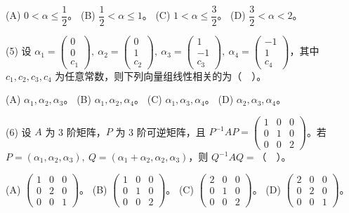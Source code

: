 \documentclass[UTF8,12pt]{ctexart}
\begin{document}
(A) \(\displaystyle 0<\alpha\leq\dfrac{\displaystyle 1}{\displaystyle 2}\)。 (B) \(\displaystyle \dfrac{\displaystyle 1}{\displaystyle 2}<\alpha\leq1\)。 (C) \(\displaystyle 1<\alpha\leq\dfrac{\displaystyle 3}{\displaystyle 2}\)。 (D) \(\displaystyle \dfrac{\displaystyle 3}{\displaystyle 2}<\alpha<2\)。


(5) 设 \(\displaystyle \alpha_1=\begin{pmatrix}0\\0\\c_1\end{pmatrix},\allowbreak \ \alpha_2=\begin{pmatrix}0\\1\\c_2\end{pmatrix},\allowbreak \ \alpha_3=\begin{pmatrix}1\\-1\\c_3\end{pmatrix},\allowbreak \ \alpha_4=\begin{pmatrix}-1\\1\\c_4\end{pmatrix}\)，其中 \(\displaystyle c_1,\allowbreak c_2,\allowbreak c_3,\allowbreak c_4\) 为任意常数，则下列向量组线性相关的为（　）。


(A) \(\displaystyle \alpha_1,\allowbreak \alpha_2,\allowbreak \alpha_3\)。 (B) \(\displaystyle \alpha_1,\allowbreak \alpha_2,\allowbreak \alpha_4\)。 (C) \(\displaystyle \alpha_1,\allowbreak \alpha_3,\allowbreak \alpha_4\)。 (D) \(\displaystyle \alpha_2,\allowbreak \alpha_3,\allowbreak \alpha_4\)。


(6) 设 \(\displaystyle A\) 为 3 阶矩阵，\(\displaystyle P\) 为 3 阶可逆矩阵，且 \(\displaystyle P^{-1}AP=\begin{pmatrix}1&0&0\\0&1&0\\0&0&2\end{pmatrix}\)。若 \(\displaystyle P=(\alpha_1,\allowbreak \alpha_2,\allowbreak \alpha_3),\allowbreak \ Q=(\alpha_1+\alpha_2,\allowbreak \alpha_2,\allowbreak \alpha_3)\)，则 \(\displaystyle Q^{-1}AQ=\)（　）。


(A) \(\displaystyle \begin{pmatrix}1&0&0\\0&2&0\\0&0&1\end{pmatrix}\)。 (B) \(\displaystyle \begin{pmatrix}1&0&0\\0&1&0\\0&0&2\end{pmatrix}\)。 (C) \(\displaystyle \begin{pmatrix}2&0&0\\0&1&0\\0&0&2\end{pmatrix}\)。 (D) \(\displaystyle \begin{pmatrix}2&0&0\\0&2&0\\0&0&1\end{pmatrix}\)。
\end{document}
